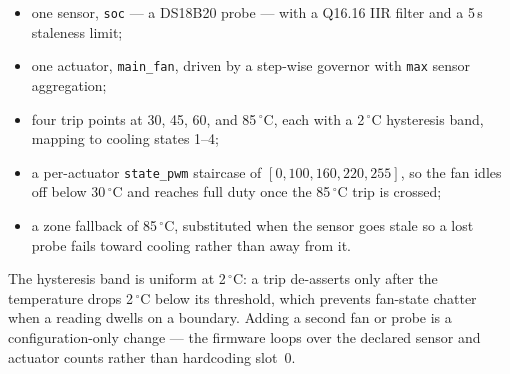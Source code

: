 \begin{itemize}[leftmargin=*]
    \item one sensor, \texttt{soc} --- a DS18B20 probe --- with a Q16.16 IIR filter and a 5\,s staleness limit;
    \item one actuator, \texttt{main\_fan}, driven by a step-wise governor with \texttt{max} sensor aggregation;
    \item four trip points at 30, 45, 60, and 85\,$^\circ$C, each with a 2\,$^\circ$C hysteresis band, mapping to cooling states 1--4;
    \item a per-actuator \texttt{state\_pwm} staircase of $[0, 100, 160, 220, 255]$, so the fan idles off below 30\,$^\circ$C and reaches full duty once the 85\,$^\circ$C trip is crossed;
    \item a zone fallback of 85\,$^\circ$C, substituted when the sensor goes stale so a lost probe fails toward cooling rather than away from it.
\end{itemize}

The hysteresis band is uniform at 2\,$^\circ$C: a trip de-asserts only after the temperature drops 2\,$^\circ$C below its threshold, which prevents fan-state chatter when a reading dwells on a boundary. Adding a second fan or probe is a configuration-only change --- the firmware loops over the declared sensor and actuator counts rather than hardcoding slot~0.

\endinput
